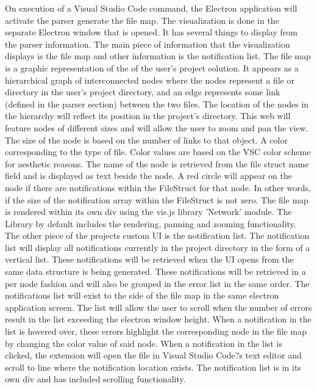 \documentclass[letterpaper,10pt,titlepage,draftclsnofoot,onecolumn,onesided] {IEEEtran}
\begin{document}
On execution of a Visual Studio Code command, the Electron application will activate the parser generate the file map. 
The visualization is done in the separate Electron window that is opened.
It has several things to display from the parser information. 
The main piece of information that the visualization displays is the file map and other information is the notification list. 
The file map is a graphic representation of the of the user's project solution. 
It appears as a hierarchical graph of interconnected nodes where the nodes represent a file or directory in the user's project directory, and an edge represents some link (defined in the parser section) between the two files. 
The location of the nodes in the hierarchy will reflect its position in the project's directory. 
This web will feature nodes of different sizes and will allow the user to zoom and pan the view. 
The size of the node is based on the number of links to that object.
A color corresponding to the type of file. 
Color values are based on the VSC color scheme for aesthetic reasons.
The name of the node is retrieved from the file struct name field and is displayed as text beside the node. 
A red circle will appear on the node if there are notifications within the FileStruct for that node. 
In other words, if the size of the notification array within the FileStruct is not zero. 
The file map is rendered within its own div using the vis.js library 'Network' module. 
The Library by default includes the rendering, panning and zooming functionality. \\

The other piece of the projects custom UI is the notification list. 
The notification list will display all notifications currently in the project directory in the form of a vertical list. 
These notifications will be retrieved when the UI opens from the same data structure is being generated. 
These notifications will be retrieved in a per node fashion and will also be grouped in the error list in the same order.
The notifications list will exist to the side of the file map in the same electron application screen. 
The list will allow the user to scroll when the number of errors result in the list exceeding the electron window height.
When a notification in the list is hovered over, these errors highlight the corresponding node in the file map by changing the color value of said node.
When a notification in the list is clicked, the extension will open the file in Visual Studio Code?s text editor and scroll to line where the notification location exists. 
The notification list is in its own div and has included scrolling functionality. \\
\end{document}
